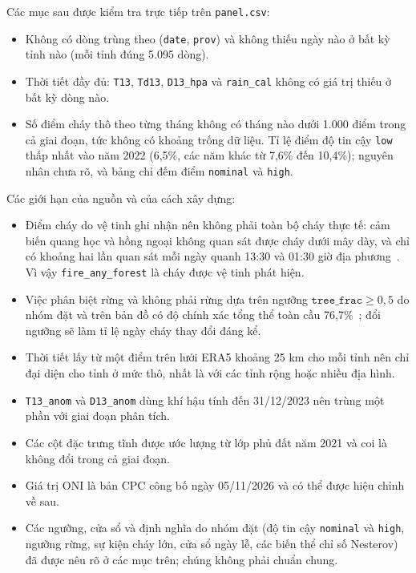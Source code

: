 \documentclass[12pt,a4paper]{article}
\begin{document}
Các mục sau được kiểm tra trực tiếp trên \texttt{panel.csv}:
\begin{itemize}
\item Không có dòng trùng theo (\texttt{date}, \texttt{prov}) và không thiếu ngày nào ở bất kỳ tỉnh nào (mỗi tỉnh đúng 5.095 dòng).
\item Thời tiết đầy đủ: \texttt{T13}, \texttt{Td13}, \texttt{D13\_hpa} và \texttt{rain\_cal} không có giá trị thiếu ở bất kỳ dòng nào.
\item Số điểm cháy thô theo từng tháng không có tháng nào dưới 1.000 điểm trong cả giai đoạn, tức không có khoảng trống dữ liệu. Tỉ lệ điểm độ tin cậy \texttt{low} thấp nhất vào năm 2022 (6,5\%, các năm khác từ 7,6\% đến 10,4\%); nguyên nhân chưa rõ, và bảng chỉ đếm điểm \texttt{nominal} và \texttt{high}.
\end{itemize}

Các giới hạn của nguồn và của cách xây dựng:
\begin{itemize}
\item Điểm cháy do vệ tinh ghi nhận nên không phải toàn bộ cháy thực tế: cảm biến quang học và hồng ngoại không quan sát được cháy dưới mây dày, và chỉ có khoảng hai lần quan sát mỗi ngày quanh 13:30 và 01:30 giờ địa phương~\cite{schroeder2014}. Vì vậy \texttt{fire\_any\_forest} là cháy được vệ tinh phát hiện.
\item Việc phân biệt rừng và không phải rừng dựa trên ngưỡng $\texttt{tree\_frac}\ge 0{,}5$ do nhóm đặt và trên bản đồ có độ chính xác tổng thể toàn cầu 76,7\%~\cite{zanaga2022}; đổi ngưỡng sẽ làm tỉ lệ ngày cháy thay đổi đáng kể.
\item Thời tiết lấy từ một điểm trên lưới ERA5 khoảng 25 km cho mỗi tỉnh nên chỉ đại diện cho tỉnh ở mức thô, nhất là với các tỉnh rộng hoặc nhiều địa hình.
\item \texttt{T13\_anom} và \texttt{D13\_anom} dùng khí hậu tính đến 31/12/2023 nên trùng một phần với giai đoạn phân tích.
\item Các cột đặc trưng tĩnh được ước lượng từ lớp phủ đất năm 2021 và coi là không đổi trong cả giai đoạn.
\item Giá trị ONI là bản CPC công bố ngày 05/11/2026 và có thể được hiệu chỉnh về sau.
\item Các ngưỡng, cửa sổ và định nghĩa do nhóm đặt (độ tin cậy \texttt{nominal} và \texttt{high}, ngưỡng rừng, sự kiện cháy lớn, cửa sổ ngày lễ, các biến thể chỉ số Nesterov) đã được nêu rõ ở các mục trên; chúng không phải chuẩn chung.
\end{itemize}
\end{document}
